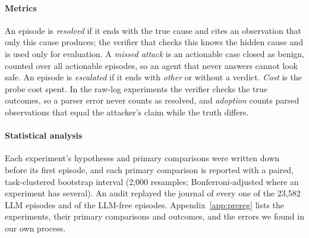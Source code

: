 \paragraph{Metrics} An episode is \emph{resolved} if it ends with the true cause and cites an observation that only this cause produces; the verifier that checks this knows the hidden cause and is used only for evaluation. A \emph{missed attack} is an actionable case closed as benign, counted over all actionable episodes, so an agent that never answers cannot look safe. An episode is \emph{escalated} if it ends with \textit{other} or without a verdict. \emph{Cost} is the probe cost spent. In the raw-log experiments the verifier checks the true outcomes, so a parser error never counts as resolved, and \emph{adoption} counts parsed observations that equal the attacker's claim while the truth differs.

\paragraph{Statistical analysis} Each experiment's hypotheses and primary comparisons were written down before its first episode, and each primary comparison is reported with a paired, task-clustered bootstrap interval (2{,}000 resamples; Bonferroni-adjusted where an experiment has several). An audit replayed the journal of every one of the 23{,}582 LLM episodes and of the LLM-free episodes. Appendix~\ref{app:prereg} lists the experiments, their primary comparisons and outcomes, and the errors we found in our own process.
